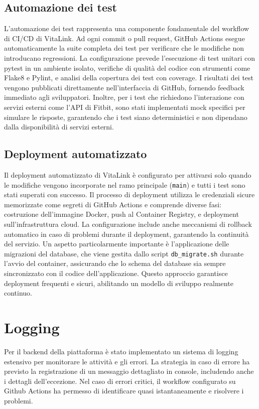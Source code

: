 \documentclass[12pt,a4paper,oneside]{report}
\begin{document}
\subsection{Automazione dei test}
L'automazione dei test rappresenta una componente fondamentale del workflow di CI/CD di VitaLink. Ad ogni commit o pull request, GitHub Actions esegue automaticamente la suite completa dei test per verificare che le modifiche non introducano regressioni. La configurazione prevede l'esecuzione di test unitari con pytest in un ambiente isolato, verifiche di qualità del codice con strumenti come Flake8 e Pylint, e analisi della copertura dei test con coverage. I risultati dei test vengono pubblicati direttamente nell'interfaccia di GitHub, fornendo feedback immediato agli sviluppatori. Inoltre, per i test che richiedono l'interazione con servizi esterni come l'API di Fitbit, sono stati implementati mock specifici per simulare le risposte, garantendo che i test siano deterministici e non dipendano dalla disponibilità di servizi esterni.

\subsection{Deployment automatizzato}
Il deployment automatizzato di VitaLink è configurato per attivarsi solo quando le modifiche vengono incorporate nel ramo principale (\texttt{main}) e tutti i test sono stati superati con successo. Il processo di deployment utilizza le credenziali sicure memorizzate come segreti di GitHub Actions e comprende diverse fasi: costruzione dell'immagine Docker, push al Container Registry, e deployment sull'infrastruttura cloud. La configurazione include anche meccanismi di rollback automatico in caso di problemi durante il deployment, garantendo la continuità del servizio. Un aspetto particolarmente importante è l'applicazione delle migrazioni del database, che viene gestita dallo script \texttt{db\_migrate.sh} durante l'avvio del container, assicurando che lo schema del database sia sempre sincronizzato con il codice dell'applicazione. Questo approccio garantisce deployment frequenti e sicuri, abilitando un modello di sviluppo realmente continuo.

\section{Logging}
Per il backend della piattaforma è stato implementato un sistema di logging estensivo per monitorare le attività e gli errori.
La strategia in caso di errore ha previsto la registrazione di un messaggio dettagliato in console, includendo anche i dettagli dell'eccezione.
Nel caso di errori critici, il workflow configurato su Github Actions ha permesso di identificare quasi istantaneamente e risolvere i problemi.
\end{document}

